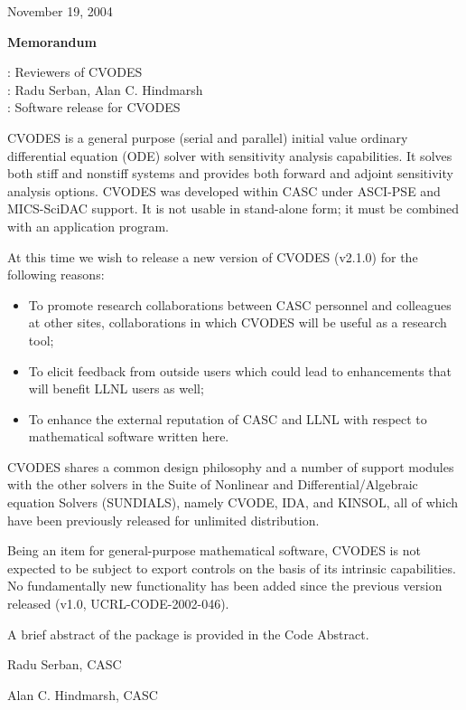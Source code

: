 \documentclass[12pt]{letter}
\begin{document}
\pagestyle{empty}

\begin{letter}

\hfill November 19, 2004

\vspace{0.2in}
\centerline{\bf Memorandum}

: Reviewers of CVODES \\
: Radu Serban, Alan C. Hindmarsh \\
: Software release for CVODES

CVODES is a general purpose (serial and parallel) initial value ordinary 
differential equation (ODE) solver with sensitivity analysis capabilities. 
It solves both stiff and nonstiff systems and provides both forward and 
adjoint sensitivity analysis options. 
CVODES was developed within CASC under ASCI-PSE and MICS-SciDAC support. 
It is not usable in stand-alone form; it must be combined with an application program.

At this time we wish to release a new version of CVODES (v2.1.0) for the 
following reasons:
\begin{itemize}
\item To promote research collaborations between CASC personnel and colleagues at 
      other sites, collaborations in which CVODES will be useful as a research tool;
\item To elicit feedback from outside users which could lead to enhancements that will 
      benefit LLNL users as well;
\item To enhance the external reputation of CASC and LLNL with respect to 
      mathematical software written here.
\end{itemize}

CVODES shares a common design philosophy and a number of support modules with the 
other solvers in the Suite of Nonlinear and Differential/Algebraic equation Solvers (SUNDIALS), 
namely CVODE, IDA, and KINSOL, all of which have been previously released for unlimited 
distribution.

Being an item for general-purpose mathematical software, CVODES is not expected to be 
subject to export controls on the basis of its intrinsic capabilities. 
No fundamentally new functionality has been added since the previous version released
(v1.0, UCRL-CODE-2002-046).

A brief abstract of the package is provided in the Code Abstract. 


\vspace{0.5in}                 
\hfill Radu Serban, CASC

\vspace{0.5in}                 
\hfill Alan C. Hindmarsh, CASC

\end{letter}
\end{document}

